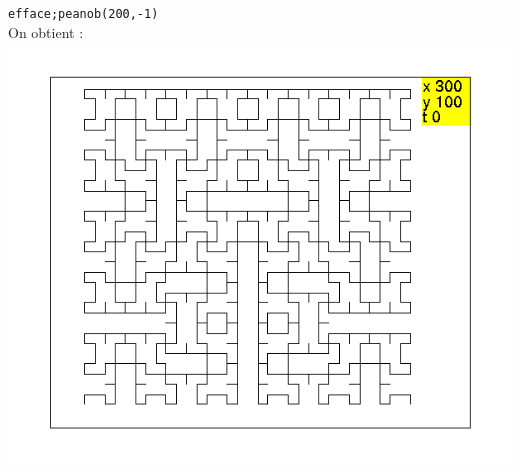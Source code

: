 \documentclass[a4paper,11pt]{book}
\begin{document}
{\tt efface;peanob(200,-1)}\\
On obtient :\\
\includegraphics[width=\textwidth]{tortpeanob1}
\end{document}
